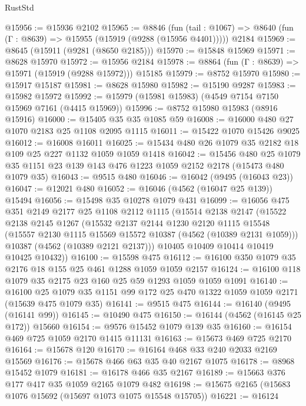 \begin{lexlean}{RustStd}
\begin{coremodule}
@15956 := @15936 @2102
@15965 := @8846
    (fun (tail : @1067) => @8640 (fun (Γ : @8639) => @15955 (@15919 (@9288 (@15956 @4401)))))
    @2184
@15969 := @8645 (@15911 (@9281 (@8650 @2185)))
@15970 := @15848 @15969
@15971 := @8628 @15970
@15972 := @15956 @2184
@15978 := @8864 (fun (Γ : @8639) => @15971 (@15919 (@9288 @15972))) @15185
@15979 := @8752 @15970
@15980 := @15917 @15187
@15981 := @8628 @15980
@15982 := @15190 @9287
@15983 := @15982 @15972
@15992 := @15979 (@15981 @15983) (@4549 @7154 @7150 @15969 @7161 (@4415 @15969))
@15996 := @8752 @15980 @15983 (@8916 @15916)
@16000 := @15405 @35 @35 @1085 @59
@16008 := @16000 @480 @27 @1070 @2183 @25 @1108 @2095 @1115
@16011 := @15422 @1070 @15426 @9025
@16012 := @16008 @16011
@16025 := @15434 @480 @26 @1079 @35 @2182 @18 @109 @25 @227 @1132 @1059 @1059 @1418
@16042 := @15456
    @480
    @25
    @1079
    @35
    @1151
    @23
    @139
    @143
    @476
    @1223
    @1059
    @2152
    @2178
    (@15473 @480 @1079 @35)
@16043 := @9515 @480
@16046 := @16042 (@9495 (@16043 @23))
@16047 := @12021 @480
@16052 := @16046 (@4562 (@16047 @25 @139)) @15494
@16056 := @15498 @35 @10278 @1079 @431
@16099 := @16056
    @475
    @351
    @2149
    @2177
    @25
    @1108
    @2112
    @1115
    (@15514
      @2138
      @2147
      (@15522
        @2138
        @2145
        @1267
        (@15532
          @2137
          @2144
          @1230
          @2120
          @1115
          @15548
          (@15557 @2130 @1115 @15569 @15572 @10387 (@4562 (@10389 @2131 @1059)))
          @10387
          (@4562 (@10389 @2121 @2137)))
        @10405
        @10409
        @10414
        @10419
        @10425
        @10432))
@16100 := @15598 @475
@16112 := @16100 @350 @1079 @35 @2176 @18 @155 @25 @461 @1288 @1059 @1059 @2157
@16124 := @16100 @118 @1079 @35 @2175 @23 @160 @25 @59 @1293 @1059 @1059 @1091
@16140 := @16100
    @25
    @1079
    @35
    @1151
    @99
    @172
    @25
    @470
    @1322
    @1059
    @1059
    @2171
    (@15639 @475 @1079 @35)
@16141 := @9515 @475
@16144 := @16140 (@9495 (@16141 @99))
@16145 := @10490 @475
@16150 := @16144 (@4562 (@16145 @25 @172)) @15660
@16154 := @9576 @15452 @1079 @139 @35
@16160 := @16154 @469 @725 @1059 @2170 @1415 @11131
@16163 := @15673 @469 @725 @2170
@16164 := @15678 @120
@16170 := @16164 @468 @33 @240 @2033 @2169 @15569
@16176 := @15678 @466 @63 @35 @40 @2167 @1075
@16178 := @8968 @15452 @1079
@16181 := @16178 @466 @35 @2167
@16189 := @15663 @376 @177 @417 @35 @1059 @2165 @1079 @482
@16198 := @15675 @2165 (@15683 @1076 @15692 (@15697 @1073 @1075 @15548 @15705))
@16221 := @16124

\end{coremodule}
\end{lexlean}
